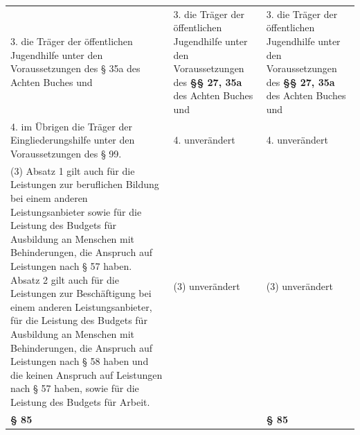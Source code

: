 \documentclass[10pt,a4paper,landscape]{article}
\begin{document}
\begin{longtable}{|L{8.2cm}|L{8.2cm}|L{8.2cm}|}
3.  \newline die Träger der öffentlichen Jugendhilfe  \newline unter den Voraussetzungen des \textcolor{diffred}{\S{}} 35a des  \newline Achten Buches und & 3.  \newline die Träger der öffentlichen Jugendhilfe  \newline unter den Voraussetzungen des \textbf{\S{}\S{} 27, 35a}  \newline des Achten Buches und & 3.  \newline die Träger der öffentlichen Jugendhilfe  \newline unter den Voraussetzungen des \textbf{\S{}\S{} 27, 35a}  \newline des Achten Buches und \\
\hhline{|---|}
4.  \newline im Übrigen die Träger der  \newline Eingliederungshilfe unter den  \newline Voraussetzungen des \S{} 99. & 4. unverändert & 4. unverändert \\
\hhline{|---|}
(3) Absatz 1 gilt auch für die Leistungen zur  \newline beruflichen Bildung bei einem anderen  \newline Leistungsanbieter sowie für die Leistung  \newline des Budgets für Ausbildung an Menschen  \newline mit Behinderungen, die Anspruch auf  \newline Leistungen nach \S{} 57 haben. Absatz 2 gilt  \newline auch für die Leistungen zur Beschäftigung  \newline bei einem anderen Leistungsanbieter, für  \newline die Leistung des Budgets für Ausbildung an  \newline Menschen mit Behinderungen, die  \newline Anspruch auf Leistungen nach \S{} 58 haben  \newline und die keinen Anspruch auf Leistungen  \newline nach \S{} 57 haben, sowie für die Leistung  \newline des Budgets für Arbeit. & (3) unverändert & (3) unverändert \\
\hhline{|---|}
\textbf{\S{} 85} &  & \textbf{\S{} 85} \\

\end{longtable}
\end{document}
